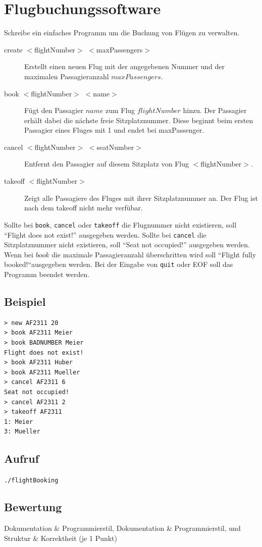 \documentclass[a4paper,10pt]{article}
\begin{document}
\section*{Flugbuchungssoftware}

Schreibe ein einfaches Programm um die Buchung von Flügen zu verwalten. 

\begin{description}
 \item[create $<$flightNumber$>$ $<$maxPassengers$>$] Erstellt einen neuen Flug mit der angegebenen Nummer und der maximalen Passagieranzahl $maxPassengers$.
 \item[book $<$flightNumber$>$ $<$name$>$] Fügt den Passagier $name$ zum Flug $flightNumber$ hinzu. Der Passagier erhält dabei die nächste freie Sitzplatznummer. Diese beginnt beim ersten Passagier eines Fluges mit 1 und endet bei maxPassenger.
 \item[cancel $<$flightNumber$>$ $<$seatNumber$>$] Entfernt den Passagier auf diesem Sitzplatz von Flug $<$flightNumber$>$.
 \item[takeoff $<$flightNumber$>$] Zeigt alle Passagiere des Fluges mit ihrer Sitzplatznummer an. Der Flug ist nach dem takeoff nicht mehr verfübar.
\end{description}

Sollte bei \texttt{book}, \texttt{cancel} oder \texttt{takeoff} die Flugnummer nicht existieren, soll ``Flight does not exist!'' ausgegeben werden. Sollte bei \texttt{cancel} die Sitzplatznummer nicht existieren, soll ``Seat not occupied!'' ausgegeben werden. Wenn bei $book$ die maximale Passagieranzahl überschritten wird soll ``Flight fully booked!``ausgegeben werden. Bei der Eingabe von \texttt{quit} oder EOF soll das Programm beendet werden.

\subsection*{Beispiel}
\begin{verbatim}
> new AF2311 20
> book AF2311 Meier
> book BADNUMBER Meier
Flight does not exist!
> book AF2311 Huber
> book AF2311 Mueller
> cancel AF2311 6
Seat not occupied!
> cancel AF2311 2
> takeoff AF2311
1: Meier
3: Mueller
\end{verbatim}

\subsection*{Aufruf}
\texttt{./flightBooking}

\subsection*{Bewertung}
Dokumentation \& Programmierstil,  Dokumentation \& Programmierstil, und Struktur \& Korrektheit (je 1 Punkt)
\newpage
\end{document}
